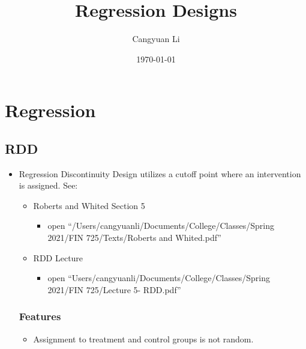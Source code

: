 \documentclass[14pt]{extreport}
\title{Regression Designs}
\author{Cangyuan Li}
\date{\today}
\begin{document}
    
\maketitle

\section{Regression}

\subsection{RDD}

\begin{itemize}
    \item Regression Discontinuity Design utilizes a cutoff point where an intervention is assigned. See:
    
    \begin{itemize}
        \item Roberts and Whited Section 5 
        
        \begin{itemize}
            \item \scriptsize{open ``/Users/cangyuanli/Documents/College/Classes/Spring 2021/FIN 725/Texts/Roberts and Whited.pdf''}
        \end{itemize}

        \item RDD Lecture
        
        \begin{itemize}
            \item \scriptsize{open ``Users/cangyuanli/Documents/College/Classes/Spring 2021/FIN 725/Lecture 5- RDD.pdf''}
        \end{itemize}

    \end{itemize}

\subsubsection{Features}

\begin{itemize}
    \item Assignment to treatment and control groups is not random.
\end{itemize}

\end{itemize}
\end{document}
